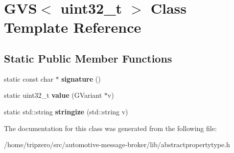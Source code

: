 \hypertarget{classGVS_3_01uint32__t_01_4}{\section{G\-V\-S$<$ uint32\-\_\-t $>$ Class Template Reference}
\label{classGVS_3_01uint32__t_01_4}
}
\subsection*{Static Public Member Functions}
\begin{DoxyCompactItemize}
\item 
\hypertarget{classGVS_3_01uint32__t_01_4_a4ead38a9a6e109e3f8cce37507cdbed5}{static const char $\ast$ {\bfseries signature} ()}\label{classGVS_3_01uint32__t_01_4_a4ead38a9a6e109e3f8cce37507cdbed5}

\item 
\hypertarget{classGVS_3_01uint32__t_01_4_aa71849881fbf20dcca20922bea646007}{static uint32\-\_\-t {\bfseries value} (G\-Variant $\ast$v)}\label{classGVS_3_01uint32__t_01_4_aa71849881fbf20dcca20922bea646007}

\item 
\hypertarget{classGVS_3_01uint32__t_01_4_ac8a872590d86a403b8441b4d0bb03a61}{static std\-::string {\bfseries stringize} (std\-::string v)}\label{classGVS_3_01uint32__t_01_4_ac8a872590d86a403b8441b4d0bb03a61}

\end{DoxyCompactItemize}


The documentation for this class was generated from the following file\-:\begin{DoxyCompactItemize}
\item 
/home/tripzero/src/automotive-\/message-\/broker/lib/abstractpropertytype.\-h\end{DoxyCompactItemize}
